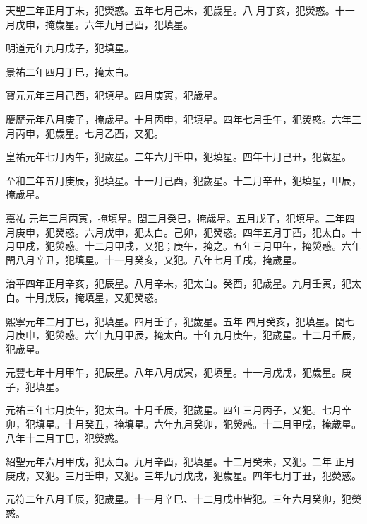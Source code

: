 \begin{pinyinscope}
 天聖三年正月丁未，犯熒惑。五年七月己未，犯歲星。八
 月丁亥，犯熒惑。十一月戊申，掩歲星。六年九月己酉，犯填星。



 明道元年九月戊子，犯填星。



 景祐二年四月丁巳，掩太白。



 寶元元年三月己酉，犯填星。四月庚寅，犯歲星。



 慶歷元年八月庚子，掩歲星。十月丙申，犯填星。四年七月壬午，犯熒惑。六年三月丙申，犯歲星。七月乙酉，又犯。



 皇祐元年七月丙午，犯歲星。二年六月壬申，犯填星。四年十月己丑，犯歲星。



 至和二年五月庚辰，犯填星。十一月己酉，犯歲星。十二月辛丑，犯填星，甲辰，掩歲星。



 嘉祐
 元年三月丙寅，掩填星。閏三月癸巳，掩歲星。五月戊子，犯填星。二年四月庚申，犯熒惑。六月戊申，犯太白。己卯，犯熒惑。四年五月丁酉，犯太白。十月甲戌，犯熒惑。十二月甲戌，又犯；庚午，掩之。五年三月甲午，掩熒惑。六年閏八月辛丑，犯填星。十一月癸亥，又犯。八年七月壬戌，掩歲星。



 治平四年正月辛亥，犯辰星。八月辛未，犯太白。癸酉，犯歲星。九月壬寅，犯太白。十月戊辰，掩填星，又犯熒惑。



 熙寧元年二月丁巳，犯填星。四月壬子，犯歲星。五年
 四月癸亥，犯填星。閏七月庚申，犯熒惑。六年九月甲辰，掩太白。十年九月庚午，犯歲星。十二月壬辰，犯歲星。



 元豐七年十月甲午，犯辰星。八年八月戊寅，犯填星。十一月戊戌，犯歲星。庚子，犯填星。



 元祐三年七月庚午，犯太白。十月壬辰，犯歲星。四年三月丙子，又犯。七月辛卯，犯填星。十月癸丑，掩填星。六年九月癸卯，犯熒惑。十二月甲戌，掩歲星。八年十二月丁巳，犯熒惑。



 紹聖元年六月甲戌，犯太白。九月辛酉，犯填星。十二月癸未，又犯。二年
 正月庚戌，又犯。三月壬申，又犯。三年九月戊戌，犯歲星。四年七月丁丑，犯熒惑。



 元符二年八月壬辰，犯歲星。十一月辛巳、十二月戊申皆犯。三年六月癸卯，犯熒惑。




\end{pinyinscope}

